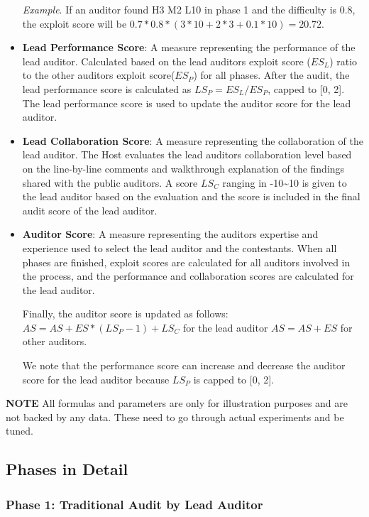 \documentclass[10pt]{extarticle}
\begin{document}
\begin{itemize}
  \emph{Example}. If an auditor found H3 M2 L10 in phase 1 and the
  difficulty is 0.8, the exploit score will be
  \(0.7*0.8*(3*10+2*3+0.1*10)=20.72\).
\item
  \textbf{Lead Performance Score}: A measure representing the
  performance of the lead auditor. Calculated based on the lead
  auditor\textquotesingle s exploit score (\(ES_L\)) ratio to the other
  auditors\textquotesingle{} exploit score(\(ES_P\)) for all phases.
  After the audit, the lead performance score is calculated as
  \(LS_P=ES_L/ES_P\), capped to {[}0, 2{]}. The lead performance score
  is used to update the auditor score for the lead auditor.
\item
  \textbf{Lead Collaboration Score}: A measure representing the
  collaboration of the lead auditor. The Host evaluates the lead
  auditor\textquotesingle s collaboration level based on the
  line-by-line comments and walkthrough explanation of the findings
  shared with the public auditors. A score \(LS_C\) ranging in
  -10\textasciitilde10 is given to the lead auditor based on the
  evaluation and the score is included in the final audit score of the
  lead auditor.
\item
  \textbf{Auditor Score}: A measure representing the
  auditor\textquotesingle s expertise and experience used to select the
  lead auditor and the contestants. When all phases are finished,
  exploit scores are calculated for all auditors involved in the
  process, and the performance and collaboration scores are calculated
  for the lead auditor.

  Finally, the auditor score is updated as follows:
  \(AS = AS + ES * (LS_P-1) + LS_C\) for the lead auditor
  \(AS = AS + ES\) for other auditors.

  We note that the performance score can increase and decrease the
  auditor score for the lead auditor because \(LS_P\) is capped to {[}0,
  2{]}.
\end{itemize}

\textbf{NOTE} All formulas and parameters are only for illustration
purposes and are not backed by any data. These need to go through actual
experiments and be tuned.

\subsection{ Phases in Detail}\label{43-phases-in-detail}

\subsubsection{ Phase 1: Traditional Audit by Lead
Auditor}\label{431-phase-1-traditional-audit-by-lead-auditor}
\end{document}
